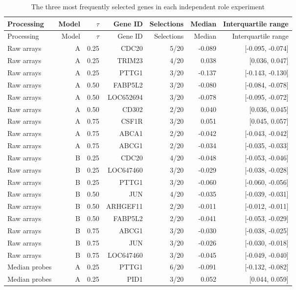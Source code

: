 \begin{longtable}{lrrrrrr}
\caption{The three most frequently selected genes in each independent role experiment}\label{tab:joint-genes}\\
\toprule
Processing & Model & $\tau$ & Gene ID & Selections & Median & Interquartile range \\
\midrule\endfirsthead
\toprule
Processing & Model & $\tau$ & Gene ID & Selections & Median & Interquartile range \\
\midrule\endhead
Raw arrays & A & 0.25 & CDC20 & 5/20 & -0.089 & [-0.095, -0.074] \\
Raw arrays & A & 0.25 & TRIM23 & 4/20 & 0.038 & [0.036, 0.047] \\
Raw arrays & A & 0.25 & PTTG1 & 3/20 & -0.137 & [-0.143, -0.130] \\
Raw arrays & A & 0.50 & FABP5L2 & 3/20 & -0.080 & [-0.084, -0.078] \\
Raw arrays & A & 0.50 & LOC652694 & 3/20 & -0.078 & [-0.095, -0.072] \\
Raw arrays & A & 0.50 & CD302 & 2/20 & 0.040 & [0.036, 0.045] \\
Raw arrays & A & 0.75 & CSF1R & 3/20 & 0.051 & [0.045, 0.057] \\
Raw arrays & A & 0.75 & ABCA1 & 2/20 & -0.042 & [-0.043, -0.042] \\
Raw arrays & A & 0.75 & ABCG1 & 2/20 & -0.034 & [-0.035, -0.033] \\
Raw arrays & B & 0.25 & CDC20 & 4/20 & -0.048 & [-0.053, -0.046] \\
Raw arrays & B & 0.25 & LOC647460 & 3/20 & -0.029 & [-0.038, -0.028] \\
Raw arrays & B & 0.25 & PTTG1 & 3/20 & -0.060 & [-0.060, -0.056] \\
Raw arrays & B & 0.50 & JUN & 4/20 & -0.035 & [-0.039, -0.031] \\
Raw arrays & B & 0.50 & ARHGEF11 & 2/20 & -0.011 & [-0.012, -0.011] \\
Raw arrays & B & 0.50 & FABP5L2 & 2/20 & -0.041 & [-0.053, -0.029] \\
Raw arrays & B & 0.75 & ABCG1 & 3/20 & -0.030 & [-0.038, -0.025] \\
Raw arrays & B & 0.75 & JUN & 3/20 & -0.026 & [-0.030, -0.018] \\
Raw arrays & B & 0.75 & LOC647460 & 3/20 & -0.045 & [-0.049, -0.040] \\
Median probes & A & 0.25 & PTTG1 & 6/20 & -0.091 & [-0.132, -0.082] \\
Median probes & A & 0.25 & PID1 & 3/20 & 0.052 & [0.044, 0.059] \\

\end{longtable}
